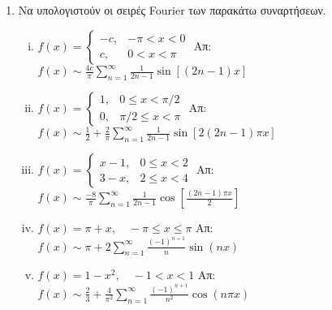 \documentclass[a4paper,table]{report}
\begin{document}
\begin{center}
\end{center}

\vspace{\baselineskip}

\begin{enumerate}
  \item Να υπολογιστούν οι σειρές \textlatin{Fourier} των παρακάτω συναρτήσεων.
    \begin{enumerate}[i),itemsep=.5\baselineskip]
      \item $ f(x) = 
        \begin{cases}
          -c, & - \pi < x < 0\\
          c, &  0 < x < \pi
        \end{cases}$
        \hfill Απ: $ f(x) \sim \frac{4c}{\pi} \sum_{n=1}^{\infty}
        \frac{1}{2n-1} \sin{[(2n-1)x]}$ 

      \item $ f(x)=
        \begin{cases} 
          1, & 0 \leq x < \pi /2 \\
          0, & \pi /2 \leq x < \pi
        \end{cases} $ 
        \hfill Απ: $ f(x) \sim \frac{1}{2} + \frac{2}{\pi} \sum_{n=1}^{\infty} 
        \frac{1}{2n-1} \sin{[2(2n-1) \pi x]} $ 

      \item $ f(x)=
        \begin{cases} 
          x-1, & 0 \leq x < 2 \\
          3-x, & 2 \leq x < 4
        \end{cases} $ 
        \hfill Απ: $ f(x) \sim \frac{-8}{\pi} \sum_{n=1}^{\infty} 
        \frac{1}{2n-1} \cos{\left[\frac{(2n-1) \pi x}{2}\right]} $ 

      \item $ f(x) = \pi + x , \quad - \pi \leq x \leq \pi $ 
        \hfill Απ: $ f(x) \sim \pi + 2 \sum_{n=1}^{\infty} \frac{(-1)^{n+1}}{n}
        \sin{(nx)} $ 

      \item $ f(x) = 1 - x^{2}, \quad - 1 < x < 1 $
        \hfill Απ: $ f(x) \sim \frac{2}{3} + \frac{4}{\pi^{2}} \sum_{n=1}^{\infty}
        \frac{(-1)^{n+1}}{n^{2}} \cos{(n \pi x)} $ 
    \end{enumerate}


\end{enumerate}
\end{document}
